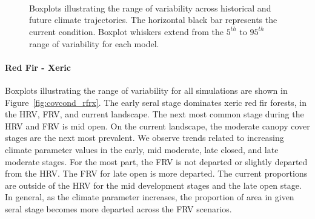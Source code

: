 \begin{figure}[htbp]
  \centering
   \\
   \\
       \\
    \caption{Boxplots illustrating the range of variability across historical and future climate trajectories. The horizontal black bar represents the current condition. Boxplot whiskers extend from the $5^{th}$ to $95^{th}$ range of variability for each model. }
  \label{fig:covcond_rfrm}
\end{figure} %

\paragraph{Red Fir - Xeric} 
Boxplots illustrating the range of variability for all simulations are shown in Figure~\ref{fig:covcond_rfrx}. The early seral stage dominates xeric red fir forests, in the HRV, FRV, and current landscape. The next most common stage during the HRV and FRV is mid open. On the current landscape, the moderate canopy cover stages are the next most prevalent. We observe trends related to increasing climate parameter values in the early, mid moderate, late closed, and late moderate stages. For the most part, the FRV is not departed or slightly departed from the HRV. The FRV for late open is more departed. The current proportions are outside of the HRV for the mid development stages and the late open stage. In general, as the climate parameter increases, the proportion of area in given seral stage becomes more departed across the FRV scenarios.


